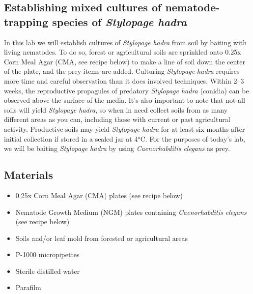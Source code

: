 \documentclass[]{book}
\providecommand{\tightlist}{%
  \setlength{\itemsep}{0pt}\setlength{\parskip}{0pt}}
\begin{document}
\hypertarget{establishing-mixed-cultures-of-nematode-trapping-species-of-stylopage-hadra}{%
\subsection{\texorpdfstring{Establishing mixed cultures of nematode-trapping species of \emph{Stylopage hadra}}{Establishing mixed cultures of nematode-trapping species of Stylopage hadra}}\label{establishing-mixed-cultures-of-nematode-trapping-species-of-stylopage-hadra}}

In this lab we will establish cultures of \emph{Stylopage hadra} from soil by baiting with living nematodes. To do so, forest or agricultural soils are sprinkled onto 0.25x Corn Meal Agar (CMA, see recipe below) to make a line of soil down the center of the plate, and the prey items are added. Culturing \emph{Stylopage hadra} requires more time and careful observation than it does involved techniques. Within 2--3 weeks, the reproductive propagules of predatory \emph{Stylopage hadra} (conidia) can be observed above the surface of the media. It's also important to note that not all soils will yield \emph{Stylopage hadra}, so when in need collect soils from as many different areas as you can, including those with current or past agricultural activity. Productive soils may yield \emph{Stylopage hadra} for at least six months after initial collection if stored in a sealed jar at 4°C. For the purposes of today's lab, we will be baiting \emph{Stylopage hadra} by using \emph{Caenorhabditis elegans} as prey.

\hypertarget{materials}{%
\subsection{Materials}\label{materials}}

\begin{itemize}
\tightlist
\item
  0.25x Corn Meal Agar (CMA) plates (see recipe below)
\item
  Nematode Growth Medium (NGM) plates containing \emph{Caenorhabditis elegans }(see recipe below)
\item
  Soils and/or leaf mold from forested or agricultural areas
\item
  P-1000 micropipettes
\item
  Sterile distilled water
\item
  Parafilm
\end{itemize}
\end{document}
